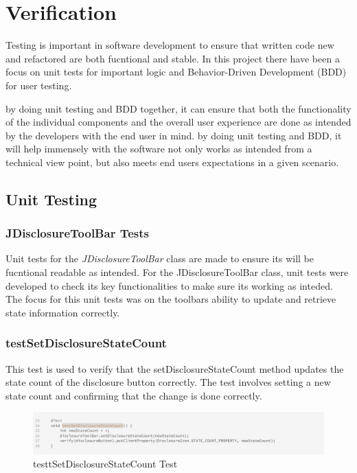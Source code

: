 \section{Verification}
Testing is important in software development to ensure that written code new and refactored are both fucntional and stable.
In this project there have been a focus on unit tests for important logic and Behavior-Driven Development (BDD) for user testing.

by doing unit testing and BDD together, it can ensure that both the functionality of the individual components and the overall user experience are done as
intended by the developers with the end user in mind.
by doing unit testing and BDD, it will help immensely with the software not only works as intended from a technical view point,
but also meets end users expectations in a given scenario.

\subsection{Unit Testing}

\subsubsection{JDisclosureToolBar Tests}
Unit tests for the \textit{JDisclosureToolBar} class are made to ensure its will be fucntional readable as intended.
For the JDisclosureToolBar class, unit tests were developed to check its key functionalities to make sure its working as inteded.
The focus for this unit tests was on the toolbars ability to update and retrieve state information correctly.


\subsubsection{testSetDisclosureStateCount}
This test is used to verify that the setDisclosureStateCount method updates the state count of the disclosure button correctly.
The test involves setting a new state count and confirming that the change is done correctly.

\begin{figure}[H]
    \centering
    \includegraphics[width=\linewidth]{pic/Test testSetDisclosureStateCount.png}
    \caption{testtSetDisclosureStateCount Test}
    \label{fig:testSetDisclosureStateCount Test}
\end{figure}

